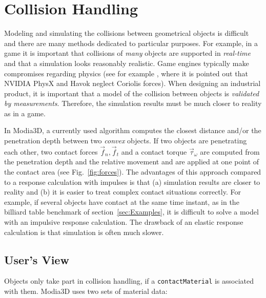 
\section{Collision Handling}\label{sec:collHandling}

Modeling and simulating the collisions between geometrical objects is difficult and there are many
methods dedicated to particular purposes. For example, in a game it is important that  
collisions of \emph{many} objects are supported in \emph{real-time} and that a simulation looks 
reasonably realistic. Game engines typically make compromises regarding physics (see for
example \cite{Erez2015}, where it is pointed out that NVIDIA PhysX and Havok neglect
Coriolis forces).
When designing an industrial product, it is important that a model of the collision between objects
is \emph{validated by measurements}. Therefore, the simulation results must
be much closer to reality as in a game.

In Modia3D, a currently used algorithm computes the closest distance and/or the penetration depth
between two \emph{convex} objects.
If two objects are penetrating each other, two contact forces $\vec{f}_n, \vec{f}_t$ and 
a contact torque $\vec{\tau}_{\omega}$ are computed from the penetration depth and the relative movement
and are applied at one point of the contact area (see Fig.~\ref{fig:forces}).
The advantages of this approach compared to a response calculation with impulses
is that (a) simulation results are closer
to reality and (b) it is easier to treat complex contact situations correctly. For example, if several objects have contact at the same time instant, as in the billiard table benchmark of section~\ref{sec:Examples}, 
it is difficult to solve a model with an impulsive response calculation. The drawback of an elastic
response calculation is that simulation is often much slower.



\subsection{User's View}

Objects only take part in collision handling, if a \texttt{contactMaterial} is
associated with them. Modia3D uses two sets of material data:

